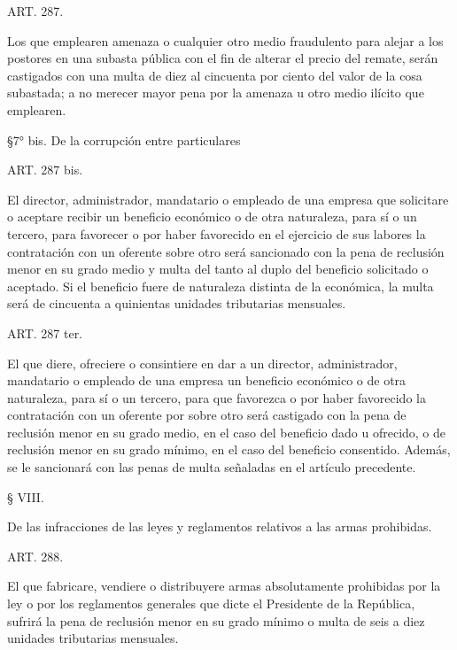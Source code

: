     ART. 287.

    Los que emplearen amenaza o cualquier otro medio fraudulento para alejar a los postores en una subasta pública con el fin de alterar el precio del remate, serán castigados con una multa de diez al cincuenta por ciento del valor de la cosa subastada; a no merecer mayor pena por la amenaza u otro medio ilícito que emplearen.



    §7° bis. De la corrupción entre particulares






   
    ART. 287 bis.

    El director, administrador, mandatario o empleado de una empresa que solicitare o aceptare recibir un beneficio económico o de otra naturaleza, para sí o un tercero, para favorecer o por haber favorecido en el ejercicio de sus labores la contratación con un oferente sobre otro será sancionado con la pena de reclusión menor en su grado medio y multa del tanto al duplo del beneficio solicitado o aceptado. Si el beneficio fuere de naturaleza distinta de la económica, la multa será de cincuenta a quinientas unidades tributarias mensuales.


   
    ART. 287 ter.

    El que diere, ofreciere o consintiere en dar a un director, administrador, mandatario o empleado de una empresa un beneficio económico o de otra naturaleza, para sí o un tercero, para que favorezca o por haber favorecido la contratación con un oferente por sobre otro será castigado con la pena de reclusión menor en su grado medio, en el caso del beneficio dado u ofrecido, o de reclusión menor en su grado mínimo, en el caso del beneficio consentido. Además, se le sancionará con las penas de multa señaladas en el artículo precedente.




    § VIII.

    De las infracciones de las leyes y reglamentos relativos a las armas prohibidas.










    ART. 288.

    El que fabricare, vendiere o distribuyere armas absolutamente prohibidas por la ley o por los reglamentos generales que dicte el Presidente de la República, sufrirá la pena de reclusión menor en su grado mínimo o multa de seis a diez unidades tributarias mensuales.









